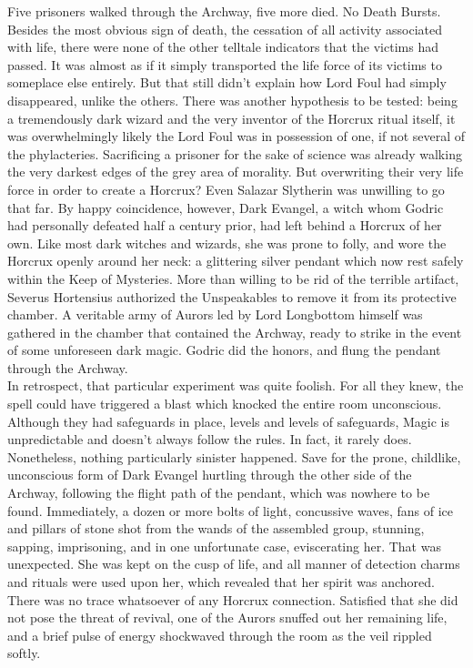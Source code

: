 Five prisoners walked through the Archway, five more died. No Death Bursts.
\SmallVSpace
Besides the most obvious sign of death, the cessation of all activity associated with life, there were none of the other telltale indicators that the victims had passed. It was almost as if it simply transported the life force of its victims to someplace else entirely. But that still didn’t explain how Lord Foul had simply disappeared, unlike the others. There was another hypothesis to be tested: being a tremendously dark wizard and the very inventor of the Horcrux ritual itself, it was overwhelmingly likely the Lord Foul was in possession of one, if not several of the phylacteries.
\SmallVSpace
Sacrificing a prisoner for the sake of science was already walking the very darkest edges of the grey area of morality. But overwriting their very life force in order to create a Horcrux? Even Salazar Slytherin was unwilling to go that far. By happy coincidence, however, Dark Evangel, a witch whom Godric had personally defeated half a century prior, had left behind a Horcrux of her own. Like most dark witches and wizards, she was prone to folly, and wore the Horcrux openly around her neck: a glittering silver pendant which now rest safely within the Keep of Mysteries.
\SmallVSpace
More than willing to be rid of the terrible artifact, Severus Hortensius authorized the Unspeakables to remove it from its protective chamber. A veritable army of Aurors led by Lord Longbottom himself was gathered in the chamber that contained the Archway, ready to strike in the event of some unforeseen dark magic.
\SomeVSpace
Godric did the honors, and flung the pendant through the Archway.\\In retrospect, that particular experiment was quite foolish. For all they knew, the spell could have triggered a blast which knocked the entire room unconscious. Although they had safeguards in place, levels and levels of safeguards, Magic is unpredictable and doesn’t always follow the rules. In fact, it rarely does.
\SmallVSpace
Nonetheless, nothing particularly sinister happened. Save for the prone, childlike, unconscious form of Dark Evangel hurtling through the other side of the Archway, following the flight path of the pendant, which was nowhere to be found. Immediately, a dozen or more bolts of light, concussive waves, fans of ice and pillars of stone shot from the wands of the assembled group, stunning, sapping, imprisoning, and in one unfortunate case, eviscerating her.
\SmallVSpace
That was unexpected.
\SmallVSpace
She was kept on the cusp of life, and all manner of detection charms and rituals were used upon her, which revealed that her spirit was anchored. There was no trace whatsoever of any Horcrux connection. Satisfied that she did not pose the threat of revival, one of the Aurors snuffed out her remaining life, and a brief pulse of energy shockwaved through the room as the veil rippled softly.
